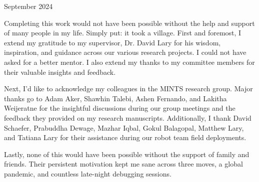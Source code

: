 \begin{acks}{September 2024}

  Completing this work would not have been possible without the help and support
  of many people in my life. Simply put: it took a village.
  First and foremost, I extend my gratitude to my supervisor, Dr.
  David Lary for his wisdom, inspiration, and guidance across our various
  research projects. I could not have asked for a better mentor. I also extend my
  thanks to my committee members for their valuable insights and feedback.

  Next, I'd like to acknowledge my colleagues in the MINTS
  research group. Major thanks go to Adam Aker, Shawhin Talebi, Ashen
  Fernando, and Lakitha Weijeratne for the insightful discussions during our
  group meetings and the feedback they provided
  on my research manuscripts. Additionally, I thank David Schaefer, Prabuddha
  Dewage, Mazhar Iqbal, Gokul Balagopal, Matthew Lary, and Tatiana Lary for
  their assistance during our robot team field deployments.

  Lastly, none of this would have been possible without the support of
  family and friends. Their persistent motivation kept me sane across
  three moves, a global pandemic, and countless late-night debugging sessions.

\end{acks}
